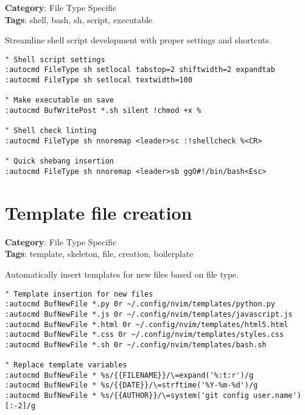 {{{{{\textbf{Category}: File Type Specific\\ \textbf{Tags}: shell, bash, sh, script, executable
\vspace{0.5cm}

Streamline shell script development with proper settings and shortcuts.

\begin{Exa*}{}
\begin{Verbatim}[fontsize=\footnotesize, breaklines, breakanywhere]
" Shell script settings
:autocmd FileType sh setlocal tabstop=2 shiftwidth=2 expandtab
:autocmd FileType sh setlocal textwidth=100

" Make executable on save
:autocmd BufWritePost *.sh silent !chmod +x %

" Shell check linting
:autocmd FileType sh nnoremap <leader>sc :!shellcheck %<CR>

" Quick shebang insertion
:autocmd FileType sh nnoremap <leader>sb ggO#!/bin/bash<Esc>
\end{Verbatim}
\end{Exa*}

\section{Template file creation}

\textbf{Category}: File Type Specific\\ \textbf{Tags}: template, skeleton, file, creation, boilerplate
\vspace{0.5cm}

Automatically insert templates for new files based on file type.

\begin{Exa*}{}
\begin{Verbatim}[fontsize=\footnotesize, breaklines, breakanywhere]
" Template insertion for new files
:autocmd BufNewFile *.py 0r ~/.config/nvim/templates/python.py
:autocmd BufNewFile *.js 0r ~/.config/nvim/templates/javascript.js
:autocmd BufNewFile *.html 0r ~/.config/nvim/templates/html5.html
:autocmd BufNewFile *.css 0r ~/.config/nvim/templates/styles.css
:autocmd BufNewFile *.sh 0r ~/.config/nvim/templates/bash.sh

" Replace template variables
:autocmd BufNewFile * %s/{{FILENAME}}/\=expand('%:t:r')/g
:autocmd BufNewFile * %s/{{DATE}}/\=strftime('%Y-%m-%d')/g
:autocmd BufNewFile * %s/{{AUTHOR}}/\=system('git config user.name')[:-2]/g
\end{Verbatim}
\end{Exa*}

}}}}}
